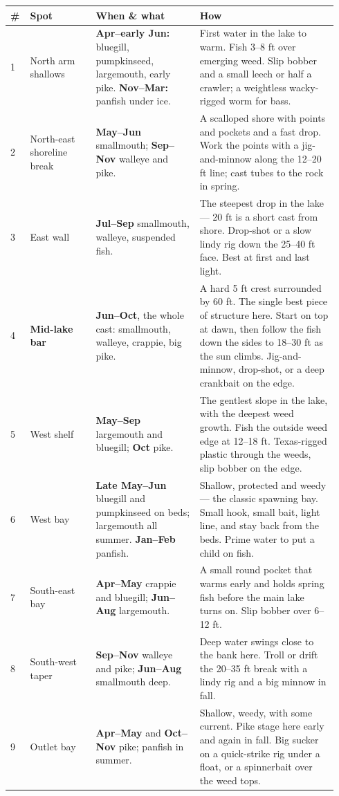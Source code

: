 \begin{longtable}{@{}p{0.045\linewidth}>{\raggedright\arraybackslash}p{0.19\linewidth}>{\raggedright\arraybackslash}p{0.30\linewidth}>{\raggedright\arraybackslash}p{0.40\linewidth}@{}}
\toprule
\textbf{\#} & \textbf{Spot} & \textbf{When \& what} & \textbf{How}\\
\midrule
\endhead
1 & North arm shallows &
  \textbf{Apr--early Jun:} bluegill, pumpkinseed, largemouth, early pike.
  \textbf{Nov--Mar:} panfish under ice. &
  First water in the lake to warm. Fish 3--8 ft over emerging weed. Slip bobber
  and a small leech or half a crawler; a weightless wacky-rigged worm for bass.\\
2 & North-east shoreline break &
  \textbf{May--Jun} smallmouth; \textbf{Sep--Nov} walleye and pike. &
  A scalloped shore with points and pockets and a fast drop. Work the points
  with a jig-and-minnow along the 12--20 ft line; cast tubes to the rock in spring.\\
3 & East wall &
  \textbf{Jul--Sep} smallmouth, walleye, suspended fish. &
  The steepest drop in the lake --- 20 ft is a short cast from shore. Drop-shot
  or a slow lindy rig down the 25--40 ft face. Best at first and last light.\\
4 & \textbf{Mid-lake bar} &
  \textbf{Jun--Oct}, the whole cast: smallmouth, walleye, crappie, big pike. &
  A hard 5 ft crest surrounded by 60 ft. The single best piece of structure here.
  Start on top at dawn, then follow the fish down the sides to 18--30 ft as the
  sun climbs. Jig-and-minnow, drop-shot, or a deep crankbait on the edge.\\
5 & West shelf &
  \textbf{May--Sep} largemouth and bluegill; \textbf{Oct} pike. &
  The gentlest slope in the lake, with the deepest weed growth. Fish the outside
  weed edge at 12--18 ft. Texas-rigged plastic through the weeds, slip bobber
  on the edge.\\
6 & West bay &
  \textbf{Late May--Jun} bluegill and pumpkinseed on beds; largemouth all summer.
  \textbf{Jan--Feb} panfish. &
  Shallow, protected and weedy --- the classic spawning bay. Small hook, small
  bait, light line, and stay back from the beds. Prime water to put a child on
  fish.\\
7 & South-east bay &
  \textbf{Apr--May} crappie and bluegill; \textbf{Jun--Aug} largemouth. &
  A small round pocket that warms early and holds spring fish before the main
  lake turns on. Slip bobber over 6--12 ft.\\
8 & South-west taper &
  \textbf{Sep--Nov} walleye and pike; \textbf{Jun--Aug} smallmouth deep. &
  Deep water swings close to the bank here. Troll or drift the 20--35 ft break
  with a lindy rig and a big minnow in fall.\\
9 & Outlet bay &
  \textbf{Apr--May} and \textbf{Oct--Nov} pike; panfish in summer. &
  Shallow, weedy, with some current. Pike stage here early and again in fall.
  Big sucker on a quick-strike rig under a float, or a spinnerbait over the weed
  tops.\\
\bottomrule
\end{longtable}

